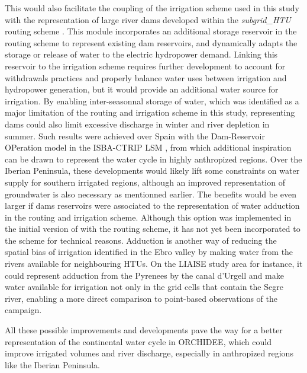 This would also facilitate the coupling of the irrigation scheme used in this study with the representation of large river dams developed within the \textit{subgrid\_HTU} routing scheme \citep{baratgin_modeling_2024}. This module incorporates an additional storage reservoir in the routing scheme to represent existing dam reservoirs, and dynamically adapts the storage or release of water to the electric hydropower demand.
Linking this reservoir to the irrigation scheme requires further development to account for withdrawals practices and properly balance water uses between irrigation and hydropower generation, but it would provide an additional water source for irrigation.
By enabling inter-seasonnal storage of water, which was identified as a major limitation of the routing and irrigation scheme in this study, representing dams could also limit excessive discharge in winter and river depletion in summer. Such results were achieved over Spain with the Dam-Reservoir OPeration model in the ISBA-CTRIP LSM \citep[DROP,][]{sadki_implementation_2023}, from which additional inspiration can be drawn to represent the water cycle in highly anthropized regions. 
Over the Iberian Peninsula, these developments would likely lift some constraints on water supply for southern irrigated regions, although an improved representation of groundwater is also necessary as mentionned earlier.
The benefits would be even larger if dams reservoirs were associated to the representation of water adduction in the routing and irrigation scheme. Although this option was implemented in the initial version of \citet{arboleda-obando_validation_2024} with the \std routing scheme, it has not yet been incorporated to the \native scheme for technical reasons. 
Adduction is another way of reducing the spatial bias of irrigation identified in the Ebro valley by making water from the rivers available for neighbouring HTUs. On the LIAISE study area for instance, it could represent adduction from the Pyrenees by the canal d'Urgell and make water available for irrigation not only in the grid cells that contain the Segre river, enabling a more direct comparison to point-based observations of the campaign.

All these possible improvements and developments pave the way for a better representation of the continental water cycle in ORCHIDEE, which could improve irrigated volumes and river discharge, especially in anthropized regions like the Iberian Peninsula. 


